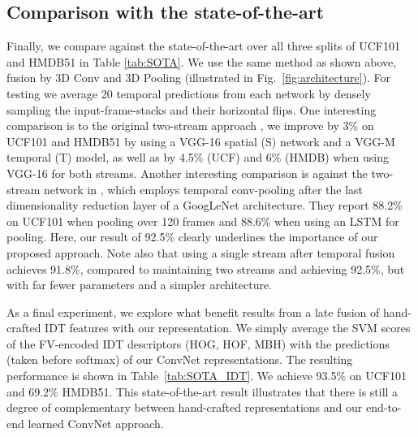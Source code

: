\documentclass[10pt,twocolumn,letterpaper]{article}
\begin{document}
\subsection{Comparison with the state-of-the-art} \label{sec:sotaComparison}
Finally, we compare against the state-of-the-art over all three splits of UCF101 and HMDB51 in Table \ref{tab:SOTA}. We use the same method as shown above, \ie fusion by 3D Conv and 3D Pooling (illustrated in Fig.~\ref{fig:architecture}). 
For testing we average 20 temporal predictions from each network by densely sampling the input-frame-stacks and their horizontal flips. One interesting comparison is to the original two-stream approach \cite{Simonyan14b}, we improve by 3\% on UCF101 and HMDB51 by using a VGG-16 spatial (S) network and a VGG-M temporal (T) model, as well as by 4.5\% (UCF) and 6\% (HMDB) when using VGG-16 for both streams. 
Another interesting comparison is against the two-stream network in \cite{ng2015beyond}, which employs temporal conv-pooling after the last dimensionality reduction layer of a GoogLeNet \cite{szegedy2014going} architecture. They report 88.2\% on UCF101 when pooling over 120 frames and 88.6\% when using an LSTM for pooling. Here, our result of
92.5\% clearly underlines the importance of our proposed approach. 
Note also that using a single stream after 
temporal fusion achieves 91.8\%, compared to maintaining two streams and achieving 
92.5\%, but with far fewer parameters and a simpler architecture.


As a final experiment, we explore what benefit results from a late fusion of hand-crafted IDT features \cite{wangICCV13} with our representation. We simply average the SVM scores of the FV-encoded IDT descriptors (\ie HOG, HOF, MBH) with the predictions (taken before softmax) of our ConvNet representations. The resulting performance is shown in Table~\ref{tab:SOTA_IDT}. We achieve 93.5\% on UCF101 and 69.2\% HMDB51. This state-of-the-art result illustrates that there is still a degree of complementary between hand-crafted representations and our end-to-end learned ConvNet approach. 
\end{document}
